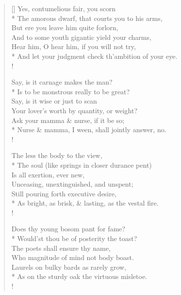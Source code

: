 \documentclass[MAIN]{subfiles}
\begin{document}
\settowidth{\versewidth}{And let your judgment check th'ambition of your eye.}
\begin{verse}[\versewidth]
\vin \vin \vin Yes, contumelious fair, you scorn\\*
\vin The amorous dwarf, that courts you to his arms,\\
\vin \vin \vin But ere you leave him quite forlorn,\\
\vin \vin And to some youth gigantic yield your charms,\\
\vin Hear him, O hear him, if you will not try,\\*
And let your judgment check th'ambition of your eye.\\!

\vin \vin \vin Say, is it carnage makes the man?\\*
\vin Is to be monstrous really to be great?\\
\vin \vin \vin Say, is it wise or just to scan\\
\vin \vin Your lover's worth by quantity, or weight?\\
\vin Ask your mamma \& nurse, if it be so;\\*
Nurse \& mamma, I ween, shall jointly answer, no.\\!

\vin \vin \vin The less the body to the view,\\*
\vin The soul (like springs in closer durance pent)\\
\vin \vin \vin Is all exertion, ever new,\\
\vin \vin Unceasing, unextinguished, and unspent;\\
\vin Still pouring forth executive desire,\\*
As bright, as brisk, \& lasting, as the vestal fire.\\!

\vin \vin \vin Does thy young bosom pant for fame?\\*
\vin Would'st thou be of posterity the toast?\\
\vin \vin \vin The poets shall ensure thy name,\\
\vin \vin Who magnitude of mind not body boast.\\
\vin Laurels on bulky bards as rarely grow,\\*
As on the sturdy oak the virtuous misletoe.\\!


\end{verse}
\end{document}
